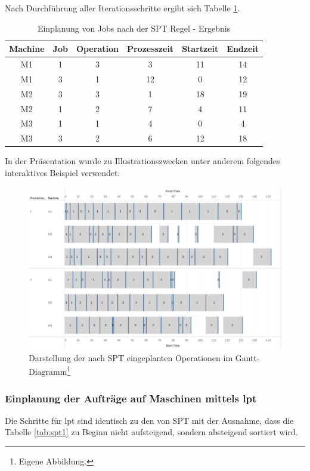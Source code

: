 \documentclass[final, english, ngerman, a4paper, 12pt, %
numbers=noenddot,
cd=true,
cdfont=false,cdfont=nohead,cdfont=nodin,
cdmath=false,
cdhead=false,
cdfoot=true,
cdcover=monochrome,
cdgeometry=symmetric,
declaration=heading,
declaration=notoc,
abstract=heading,
]{tudscrreprt}
\begin{document}
\noindent
Nach Durchführung aller Iterationsschritte ergibt sich Tabelle \ref{tab:spt2}.

\begin{table}[H]
	\centering
	\begin{tabular}{c c c c c c}
		\toprule
		Machine & Job & Operation & Prozesszeit & Startzeit & Endzeit \\
		\midrule
		M1 & 1 & 3 & 3 & 11 & 14\\
		M1 & 3 & 1 & 12 & 0 & 12\\
		M2 & 3 & 3 & 1 & 18 & 19\\
		M2 & 1 & 2 & 7 & 4 & 11\\
		M3 & 1 & 1 & 4 & 0 & 4\\
		M3 & 3 & 2 & 6 & 12 & 18\\
		\bottomrule
	\end{tabular}
	\caption{Einplanung von Jobs nach der SPT Regel - Ergebnis}
	\label{tab:spt2}
\end{table}

\noindent
In der Präsentation wurde zu Illustrationszwecken unter anderem folgendes interaktives Beispiel verwendet:

\begin{figure}[H]
	\centering
	\includegraphics[width=\textwidth]{./settings/spt}
	\caption[Interaktives Beispiel - Einplanung nach der SPT Regel]{Darstellung der nach SPT eingeplanten Operationen im Gantt-Diagramm\footnote{Eigene Abbildung.}}\label{fig:spt}
\end{figure}

\subsubsection{Einplanung der Aufträge auf Maschinen mittels \gls{lpt} }
Die Schritte für \gls{lpt} sind identisch zu den von SPT mit der Ausnahme, dass die Tabelle \ref{tab:spt1} zu Beginn nicht aufsteigend, sondern absteigend sortiert wird. \\
\end{document}
